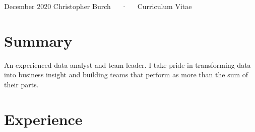 \documentclass[11pt, a4paper]{awesome-cv}
\begin{document}
\makecvheader

\makecvfooter
  {December 2020}
    {Christopher Burch~~~·~~~Curriculum Vitae}
  {\thepage}





\hypertarget{summary}{%
\section{Summary}\label{summary}}

An experienced data analyst and team leader. I take pride in
transforming data into business insight and building teams that perform
as more than the sum of their parts.

\hypertarget{experience}{%
\section{Experience}\label{experience}}
\end{document}
